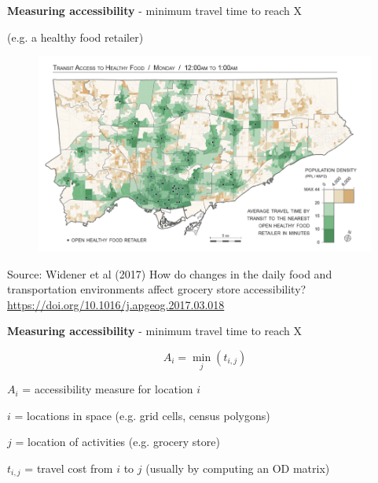 \documentclass[aspectratio=169]{beamer}
\begin{document}
\begin{frame}
	
	\textbf{Measuring accessibility} - minimum travel time to reach X 
	
	(e.g. a healthy food retailer)
		
	\begin{figure}
		\centering
		\includegraphics[width=0.86\linewidth]{images/food_midnight.png}
	\end{figure}

	\tiny Source: Widener et al (2017) How do changes in the daily food and transportation environments affect grocery store accessibility? \url{https://doi.org/10.1016/j.apgeog.2017.03.018}
	
\end{frame}



\begin{frame}
	
	\textbf{Measuring accessibility} - minimum travel time to reach X
	
	\vspace{4mm}
	
	\[A_i = \min_j (t_{i,j})
	\]
	
	\vspace{1mm}
		
	$A_i$ = accessibility measure for location $i$
	
	\vspace{1mm}
	
	$i$ = locations in space (e.g. grid cells, census polygons)
	
	\vspace{1mm}
	
	$j$ = location of activities (e.g. grocery store)
	
	\vspace{1mm}
	
	$t_{i,j}$ = travel cost from $i$ to $j$ (usually by computing an OD matrix)
	
\end{frame}
\end{document}

